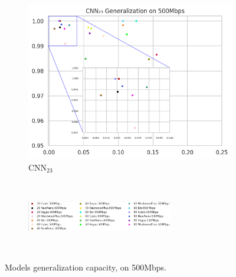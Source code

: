 \documentclass[a4paper,fleqn]{cas-sc}
\begin{document}
\begin{figure}[h!]
\begin{minipage}[t]{0.46\textwidth}
\begin{subfigure}[t]{0.33\textwidth}
			\includegraphics[draft=false, width=\textwidth]{./figs/Generalizacao-CNN23-500Mbps.png} 
			\caption{CNN$_{23}$}
			\label{fig:Generalizacao-CNN23-500Mbps}
		\end{subfigure}%
		~
		
		\begin{subfigure}[t]{\textwidth}
			\centering
			\includegraphics[draft=false, width=0.7\textwidth]{./figs/legenta_500Mbps.png} 
			\label{fig:legenda-10Mbps}
		\end{subfigure}%
		~
	\hfill
	\caption{Models generalization capacity, on 500Mbps.\hspace{8.5cm}}
	\label{fig:Generalizacao-500Mbps}
	

\end{minipage}
\end{figure}
\end{document}
